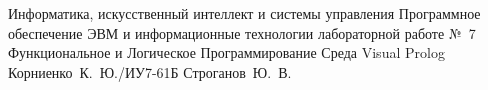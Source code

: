 \documentclass{bmstu}
\begin{document}
\makereporttitle
    {Информатика, искусственный интеллект и системы управления}
    {Программное обеспечение ЭВМ и информационные технологии}
    {лабораторной работе №~7}
    {Функциональное и Логическое Программирование}
    {Среда Visual Prolog}
    {}
    {Корниенко~К.~Ю./ИУ7-61Б}
    {Строганов~Ю.~В.}


\end{document}
